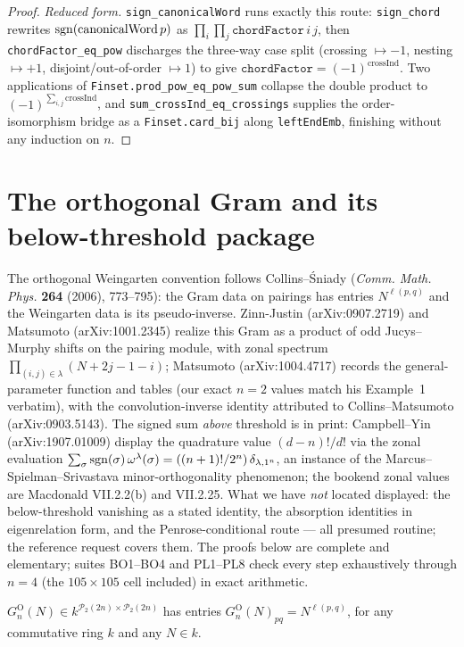 \begin{proof}
\medskip\noindent\emph{Reduced form.} \texttt{sign\_canonicalWord} runs exactly this
route: \texttt{sign\_chord} rewrites $\operatorname{sgn}(\text{canonicalWord}\,p)$ as
$\prod_i\prod_j \texttt{chordFactor}\,i\,j$, then \texttt{chordFactor\_eq\_pow} discharges
the three-way case split (crossing $\mapsto -1$, nesting $\mapsto +1$, disjoint/out-of-order
$\mapsto 1$) to give $\texttt{chordFactor}=(-1)^{\mathrm{crossInd}}$. Two applications of
\texttt{Finset.prod\_pow\_eq\_pow\_sum} collapse the double product to
$(-1)^{\sum_{i,j}\mathrm{crossInd}}$, and \texttt{sum\_crossInd\_eq\_crossings} supplies the
order-isomorphism bridge as a \texttt{Finset.card\_bij} along \texttt{leftEndEmb}, finishing
without any induction on $n$.
\end{proof}

\chapter{The orthogonal Gram and its below-threshold package}\label{ch:orthogonal}

The orthogonal Weingarten convention follows Collins--\'Sniady
(\emph{Comm. Math. Phys.} \textbf{264} (2006), 773--795): the Gram data on
pairings has entries $N^{\ell(p,q)}$ and the Weingarten data is its
pseudo-inverse. Zinn-Justin (arXiv:0907.2719) and Matsumoto
(arXiv:1001.2345) realize this Gram as a
product of odd Jucys--Murphy shifts on the pairing module, with zonal
spectrum $\prod_{(i,j)\in\lambda}(N+2j-1-i)$; Matsumoto (arXiv:1004.4717)
records the general-parameter function and tables (our exact $n=2$ values
match his Example~1 verbatim), with the convolution-inverse identity
attributed to Collins--Matsumoto (arXiv:0903.5143). The signed sum
\emph{above} threshold is in print: Campbell--Yin (arXiv:1907.01009) display
the quadrature value $(d-n)!/d!$ via the zonal evaluation
$\sum_\sigma\operatorname{sgn}(\sigma)\,\omega^\lambda(\sigma) =
((n+1)!/2^n)\,\delta_{\lambda,1^n}$, an instance of the
Marcus--Spielman--Srivastava minor-orthogonality phenomenon; the bookend
zonal values are Macdonald VII.2.2(b) and VII.2.25. What we have \emph{not}
located displayed: the below-threshold vanishing as a stated identity, the
absorption identities in eigenrelation form, and the Penrose-conditional
route --- all presumed routine; the reference request covers them. The
proofs below are complete and elementary; suites BO1--BO4 and PL1--PL8
check every step exhaustively through $n=4$ (the $105\times105$ cell
included) in exact arithmetic.

\begin{definition}\label{def:orth_gram}
\leanok
{}
$G^{\mathrm O}_n(N)\in k^{\mathcal P_2(2n)\times\mathcal P_2(2n)}$ has
entries $G^{\mathrm O}_n(N)_{pq} = N^{\ell(p,q)}$, for any commutative ring
$k$ and any $N\in k$.
\end{definition}

